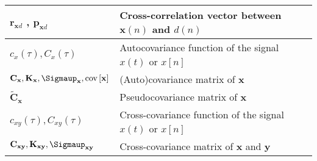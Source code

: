 \begin{xltabular}{\textwidth}{XX}
	\(\mathbf{r}_{\mathbf{x}d}\) \cite{haykinNeuralNetworksLearning2009}, \(\mathbf{p}_{\mathbf{x}d}\) \cite{dinizAdaptiveFilteringAlgorithms2002} & Cross-correlation vector between \(\mathbf{x}(n)\) and \(d(n)\)                                                                                                                                                                    \\ \hline
	\(c_x(\tau), C_x(\tau)\)                                                                                                                       & Autocovariance function of the signal \(x(t)\) or \(x[n]\) \cite{nossekAdaptiveArraySignal2015}                                                                                                                                    \\ \hline
	\(\mathbf{C}_\mathbf{x}, \mathbf{K}_\mathbf{x}, \boldsymbol{\Sigmaup}_\mathbf{x}, \textnormal{cov}\left[ \mathbf{x} \right]\)                  & (Auto)covariance matrix of \(\mathbf{x}\) \cite{vantreesOptimumArrayProcessing2002,proakisDigitalCommunications2007,leon-garciaProbabilityStatisticsRandom2007,haykinAdaptiveFilterTheory2002,bishopPatternRecognitionMachine2006} \\ \hline
	\(\tilde{\mathbf{C}}_\mathbf{x}\)\cite{proakisDigitalCommunications2007}                                                                       & Pseudocovariance matrix of \(\mathbf{x}\)                                                                                                                                                                                          \\ \hline
	\(c_{xy}(\tau), C_{xy}(\tau)\)                                                                                                                 & Cross-covariance function of the signal \(x(t)\) or \(x[n]\) \cite{nossekAdaptiveArraySignal2015}                                                                                                                                  \\ \hline
	\(\mathbf{C}_{\mathbf{xy}}, \mathbf{K}_{\mathbf{xy}}, \boldsymbol{\Sigmaup}_{\mathbf{xy}}\)                                                    & Cross-covariance matrix of \(\mathbf{x}\) and \(\mathbf{y}\)
\end{xltabular}

